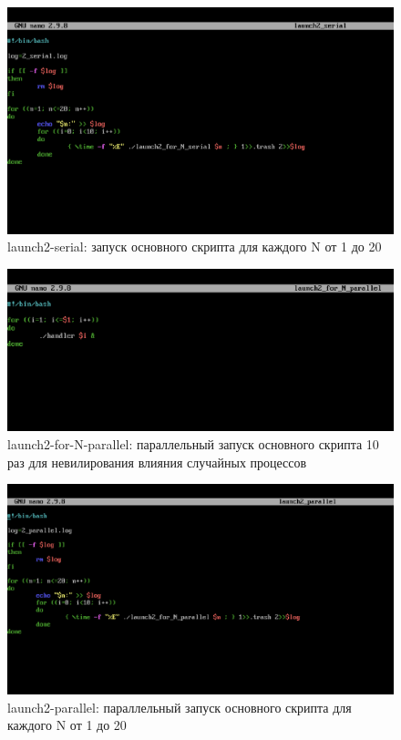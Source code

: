 \documentclass{article}
\begin{document}
\begin{figure}[H]
\centering
\includegraphics[width=1\textwidth]{images/14.png}
\caption{launch2-serial: запуск основного скрипта для каждого N от 1 до 20}
\end{figure}

\begin{figure}[H]
\centering
\includegraphics[width=1\textwidth]{images/15.png}
\caption{launch2-for-N-parallel: параллельный запуск основного скрипта 10 раз для невилирования влияния случайных процессов}
\end{figure}

\begin{figure}[H]
\centering
\includegraphics[width=1\textwidth]{images/16.png}
\caption{launch2-parallel: параллельный запуск основного скрипта для каждого N от 1 до 20}
\end{figure}
\end{document}
